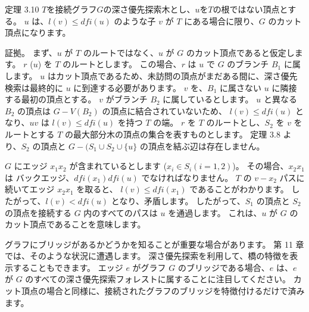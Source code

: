 
定理 3.10
$T$を接続グラフ$G$の深さ優先探索木とし、$u$を$T$の根ではない頂点とする。 
$u$ は、$l(v) \leq dfi(u)$ のような子 $v$ が $T$ にある場合に限り、$G$ のカット頂点になります。

証拠。
まず、$u$ が $T$ のルートではなく、$u$ が $G$ のカット頂点であると仮定します。
 $r$ ($u$) を $T$ のルートとします。 この場合、$r$ は $u$ で $G$ のブランチ $B_1$ に属します。 
 $u$ はカット頂点であるため、未訪問の頂点がまだある間に、深さ優先検索は最終的に $u$ に到達する必要があります。 
 $v$ を、$B_1$ に属さない $u$ に隣接する最初の頂点とする。 $v$ がブランチ $B_2$ に属しているとします。 
 $u$ と異なる $B_2$ の頂点は $G - V(B_2)$ の頂点に結合されていないため、 $l(v) \leq dfi(u)$ となり、$uv$ は $l(v) \leq dfi(u)$ を持つ
 $T$ の端。 $r$ を $T$ のルートとし、$S_2$ を $v$ をルートとする $T$ の最大部分木の頂点の集合を表すものとします。 
 定理 3.8 より、$S_2$ の頂点と $G-(S_1\cup S_2 \cup \{u\}$ の頂点を結ぶ辺は存在しません。

$G$ にエッジ $x_1x_2$ が含まれているとします ($x_i \in S_i (i = 1, 2)$)。 その場合、$x_2x_1$ は
バックエッジ、$dfi(x_1) dfi(u)$ でなければなりません。 $T$ の $v-x_2$ パスに続いてエッジ $x_2x_1$ を取ると、
$l(v) \leq dfi(x_1)$ であることがわかります。 したがって、$l(v) < dfi(u)$ となり、矛盾します。
したがって、$S_1$ の頂点と $S_2$ の頂点を接続する $G$ 内のすべてのパスは $u$ を通過します。
これは、$u$ が $G$ のカット頂点であることを意味します。

グラフにブリッジがあるかどうかを知ることが重要な場合があります。 
第 11 章では、そのような状況に遭遇します。 深さ優先探索を利用して、橋の特徴を表示することもできます。
エッジ $e$ がグラフ $G$ のブリッジである場合、$e$ は、$e$ が $G$ のすべての深さ優先探索フォレストに属することに注目してください。
カット頂点の場合と同様に、接続されたグラフのブリッジを特徴付けるだけで済みます。